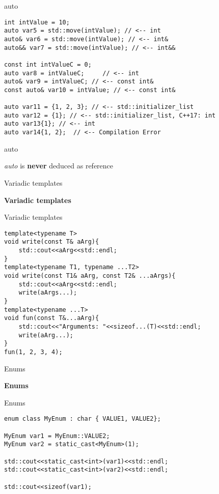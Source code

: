 \documentclass{beamer}
\begin{document}
\begin{frame}[fragile]{auto}
\begin{lstlisting}[style=customcpp]
int intValue = 10;
auto var5 = std::move(intValue); // <-- int
auto& var6 = std::move(intValue); // <-- int&
auto&& var7 = std::move(intValue); // <-- int&&

const int intValueC = 0;
auto var8 = intValueC;     // <-- int
auto& var9 = intValueC; // <-- const int&
const auto& var10 = intValue; // <-- const int&

auto var11 = {1, 2, 3}; // <-- std::initializer_list
auto var12 = {1}; // <-- std::initializer_list, C++17: int
auto var13{1}; // <-- int
auto var14{1, 2};  // <-- Compilation Error
\end{lstlisting}
\end{frame}

\begin{frame}[fragile]{auto}

{\Huge \textit{auto} is \textbf{never} deduced as reference}
\end{frame}

\begin{frame}[fragile]{Variadic templates}
\begin{center}
{\Huge \textbf{Variadic templates}}
\end{center}
\end{frame}

\begin{frame}[fragile]{Variadic templates}
\begin{lstlisting}[style=customcpp]
template<typename T>
void write(const T& aArg){
	std::cout<<aArg<<std::endl;
}
template<typename T1, typename ...T2>
void write(const T1& aArg, const T2& ...aArgs){
	std::cout<<aArg<<std::endl;
	write(aArgs...);
}
template<typename ...T>
void fun(const T&...aArg){
	std::cout<<"Arguments: "<<sizeof...(T)<<std::endl;
	write(aArg...);
}
fun(1, 2, 3, 4);
\end{lstlisting}
\end{frame}

\begin{frame}[fragile]{Enums}
\begin{center}
{\Huge \textbf{Enums}}
\end{center}
\end{frame}

\begin{frame}[fragile]{Enums}
\begin{lstlisting}[style=customcpp]
enum class MyEnum : char { VALUE1, VALUE2};

MyEnum var1 = MyEnum::VALUE2;
MyEnum var2 = static_cast<MyEnum>(1);

std::cout<<static_cast<int>(var1)<<std::endl;
std::cout<<static_cast<int>(var2)<<std::endl;

std::cout<<sizeof(var1);
\end{lstlisting}
\end{frame}
\end{document}
